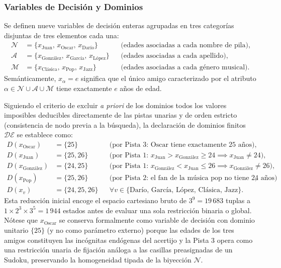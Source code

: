 \subsubsection{Variables de Decisión y Dominios}

Se definen nueve variables de decisión enteras agrupadas en tres categorías disjuntas de tres elementos cada una:
\begin{align*}
    \mathcal{N} &= \{x_{\text{Juan}},\, x_{\text{Oscar}},\, x_{\text{Darío}}\} && \text{(edades asociadas a cada nombre de pila)}, \\
    \mathcal{A} &= \{x_{\text{González}},\, x_{\text{García}},\, x_{\text{López}}\} && \text{(edades asociadas a cada apellido)}, \\
    \mathcal{M} &= \{x_{\text{Clásica}},\, x_{\text{Pop}},\, x_{\text{Jazz}}\} && \text{(edades asociadas a cada género musical)}.
\end{align*}
Semánticamente, $x_{\alpha} = e$ significa que el único amigo caracterizado por el atributo $\alpha \in \mathcal{N} \cup \mathcal{A} \cup \mathcal{M}$ tiene exactamente $e$ años de edad.

Siguiendo el criterio de excluir \emph{a priori} de los dominios todos los valores imposibles deducibles directamente de las pistas unarias y de orden estricto (consistencia de nodo previa a la búsqueda), la declaración de dominios finitos $\mathcal{DE}$ se establece como:
\begin{align*}
    D(x_{\text{Oscar}})    &= \{25\}         && \text{(por Pista 3: Oscar tiene exactamente $25$ años)}, \\
    D(x_{\text{Juan}})     &= \{25, 26\}     && \text{(por Pista 1: } x_{\text{Juan}} > x_{\text{González}} \ge 24 \implies x_{\text{Juan}} \neq 24\text{)}, \\
    D(x_{\text{González}}) &= \{24, 25\}     && \text{(por Pista 1: } x_{\text{González}} < x_{\text{Juan}} \le 26 \implies x_{\text{González}} \neq 26\text{)}, \\
    D(x_{\text{Pop}})      &= \{25, 26\}     && \text{(por Pista 2: el fan de la música pop no tiene $24$ años)}, \\
    D(x_{v})               &= \{24, 25, 26\} && \forall v \in \{\text{Darío},\, \text{García},\, \text{López},\, \text{Clásica},\, \text{Jazz}\}.
\end{align*}
Esta reducción inicial encoge el espacio cartesiano bruto de $3^9 = 19\,683$ tuplas a $1 \times 2^3 \times 3^5 = 1\,944$ estados antes de evaluar una sola restricción binaria o global. Nótese que $x_{\text{Oscar}}$ se conserva formalmente como variable de decisión con dominio unitario $\{25\}$ (y no como parámetro externo) porque las edades de los tres amigos constituyen las incógnitas endógenas del acertijo y la Pista 3 opera como una restricción unaria de fijación análoga a las casillas preasignadas de un Sudoku, preservando la homogeneidad tipada de la biyección $\mathcal{N}$.

